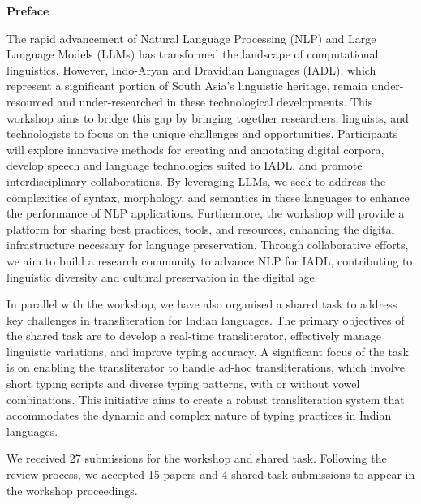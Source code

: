 \documentclass[11pt,a4paper]{article}
\begin{document}
\begin{center}
  {\Large \bf Preface}
\end{center}
The rapid advancement of Natural Language Processing (NLP) and Large Language Models (LLMs) has transformed the landscape of computational linguistics. However, Indo-Aryan and Dravidian Languages (IADL), which represent a significant portion of South Asia's linguistic heritage, remain under-resourced and under-researched in these technological developments. This workshop aims to bridge this gap by bringing together researchers, linguists, and technologists to focus on the unique challenges and opportunities. Participants will explore innovative methods for creating and annotating digital corpora, develop speech and language technologies suited to IADL, and promote interdisciplinary collaborations. By leveraging LLMs, we seek to address the complexities of syntax, morphology, and semantics in these languages to enhance the performance of NLP applications. Furthermore, the workshop will provide a platform for sharing best practices, tools, and resources, enhancing the digital infrastructure necessary for language preservation. Through collaborative efforts, we aim to build a research community to advance NLP for IADL, contributing to linguistic diversity and cultural preservation in the digital age.

In parallel with the workshop, we have also organised a shared task to address key challenges in transliteration for Indian languages. The primary objectives of the shared task are to develop a real-time transliterator, effectively manage linguistic variations, and improve typing accuracy. A significant focus of the task is on enabling the transliterator to handle ad-hoc transliterations, which involve short typing scripts and diverse typing patterns, with or without vowel combinations. This initiative aims to create a robust transliteration system that accommodates the dynamic and complex nature of typing practices in Indian languages.

We received 27 submissions for the workshop and shared task. Following the review process, we accepted 15 papers and 4 shared task submissions to appear in the workshop proceedings. 
\end{document}

